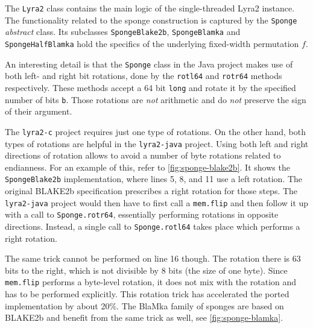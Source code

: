 The \texttt{Lyra2} class contains the main logic of the single-threaded Lyra2 instance. The functionality related to the sponge construction is captured by the \texttt{Sponge} \emph{abstract} class. Its subclasses \texttt{SpongeBlake2b}, \texttt{SpongeBlamka} and \texttt{SpongeHalfBlamka} hold the specifics of the underlying fixed-width permutation \(f\).

An interesting detail is that the \texttt{Sponge} class in the Java project makes use of both left- and right bit rotations, done by the \texttt{rotl64} and \texttt{rotr64} methods respectively. These methods accept a 64 bit \texttt{long} and rotate it by the specified number of bits \texttt{b}. Those rotations are \emph{not} arithmetic and do \emph{not} preserve the sign of their argument.

The \texttt{lyra2-c} project requires just one type of rotations. On the other hand, both types of rotations are helpful in the \texttt{lyra2-java} project. Using both left and right directions of rotation allows to avoid a number of byte rotations related to endianness. For an example of this,  refer to \autoref{fig:sponge-blake2b}. It shows the \texttt{SpongeBlake2b} implementation, where lines 5, 8, and 11 use a left rotation. The original BLAKE2b specification prescribes a right rotation for those steps. The \texttt{lyra2-java} project would then have to first call a \texttt{mem.flip} and then follow it up with a call to \texttt{Sponge.rotr64}, essentially performing rotations in opposite directions. Instead, a single call to \texttt{Sponge.rotl64} takes place which performs a right rotation.

The same trick cannot be performed on line 16 though. The rotation there is 63 bits to the right, which is not divisible by 8 bits (the size of one byte). Since \texttt{mem.flip} performs a byte-level rotation, it does not mix with the rotation and has to be performed explicitly. This rotation trick has accelerated the ported implementation by about 20\%. The BlaMka family of sponges are based on BLAKE2b and benefit from the same trick as well, see \autoref{fig:sponge-blamka}.

